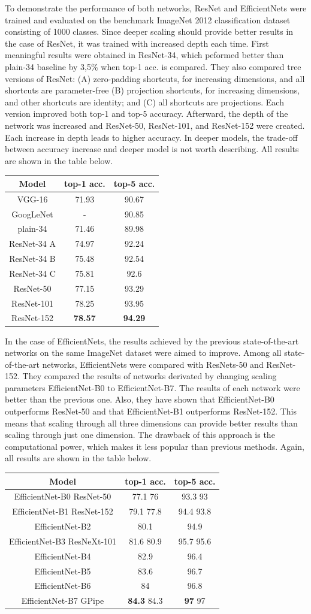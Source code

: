 \documentclass[
]{krantz}
\begin{document}
To demonstrate the performance of both networks, ResNet and EfficientNets were trained and evaluated on the benchmark ImageNet 2012 classification dataset consisting of 1000 classes.
Since deeper scaling should provide better results in the case of ResNet, it was trained with increased depth each time. First meaningful results were obtained in ResNet-34, which peformed better than plain-34 baseline by 3,5\% when top-1 acc. is compared. They also compared tree versions of ResNet: (A) zero-padding shortcuts, for increasing dimensions, and all shortcuts are parameter-free (B) projection shortcuts, for increasing dimensions, and other shortcuts are identity; and (C) all shortcuts are projections. Each version improved both top-1 and top-5 accuracy.
Afterward, the depth of the network was increased and ResNet-50, ResNet-101, and ResNet-152 were created. Each increase in depth leads to higher accuracy. In deeper models, the trade-off between accuracy increase and deeper model is not worth describing. All results are shown in the table below.

\begin{longtable}[]{@{}ccc@{}}
\toprule
Model & top-1 acc. & top-5 acc.\tabularnewline
\midrule
\endhead
VGG-16 & 71.93 & 90.67\tabularnewline
GoogLeNet & - & 90.85\tabularnewline
plain-34 & 71.46 & 89.98\tabularnewline
ResNet-34 A & 74.97 & 92.24\tabularnewline
ResNet-34 B & 75.48 & 92.54\tabularnewline
ResNet-34 C & 75.81 & 92.6\tabularnewline
ResNet-50 & 77.15 & 93.29\tabularnewline
ResNet-101 & 78.25 & 93.95\tabularnewline
ResNet-152 & \textbf{78.57} & \textbf{94.29}\tabularnewline
\bottomrule
\end{longtable}

In the case of EfficientNets, the results achieved by the previous state-of-the-art networks on the same ImageNet dataset were aimed to improve. Among all state-of-the-art networks, EfficientNets were compared with ResNets-50 and ResNet-152. They compared the results of networks derivated by changing scaling parameters EfficientNet-B0 to EfficientNet-B7. The results of each network were better than the previous one. Also, they have shown that EfficientNet-B0 outperforms ResNet-50 and that EfficientNet-B1 outperforms ResNet-152. This means that scaling through all three dimensions can provide better results than scaling through just one dimension. The drawback of this approach is the computational power, which makes it less popular than previous methods. Again, all results are shown in the table below.

\begin{longtable}[]{@{}ccc@{}}
\toprule
Model & top-1 acc. & top-5 acc.\tabularnewline
\midrule
\endhead
EfficientNet-B0 ResNet-50 & 77.1 76 & 93.3 93\tabularnewline
EfficientNet-B1 ResNet-152 & 79.1 77.8 & 94.4 93.8\tabularnewline
EfficientNet-B2 & 80.1 & 94.9\tabularnewline
EfficientNet-B3 ResNeXt-101 & 81.6 80.9 & 95.7 95.6\tabularnewline
EfficientNet-B4 & 82.9 & 96.4\tabularnewline
EfficientNet-B5 & 83.6 & 96.7\tabularnewline
EfficientNet-B6 & 84 & 96.8\tabularnewline
EfficientNet-B7 GPipe & \textbf{84.3} 84.3 & \textbf{97} 97\tabularnewline
\bottomrule
\end{longtable}
\end{document}
